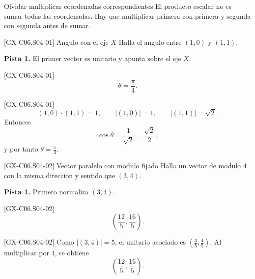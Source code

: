 \begin{commonerror}{Olvidar multiplicar coordenadas correspondientes}
El producto escalar no es sumar todas las coordenadas. Hay que multiplicar primera con primera
y segunda con segunda antes de sumar.
\end{commonerror}

\begin{guidedexercise}{[GX-C06.S04-01] Angulo con el eje \(X\)}
Halla el angulo entre \((1,0)\) y \((1,1)\).

\textbf{Pista 1.} El primer vector es unitario y apunta sobre el eje \(X\).
\end{guidedexercise}

\begin{shortanswer}{[GX-C06.S04-01]}
\[
\theta=\frac{\pi}{4}.
\]
\end{shortanswer}

\begin{fullsolution}{[GX-C06.S04-01]}
\[
(1,0)\cdot (1,1)=1,
\qquad
|(1,0)|=1,
\qquad
|(1,1)|=\sqrt{2}.
\]
Entonces
\[
\cos \theta=\frac{1}{\sqrt{2}}=\frac{\sqrt{2}}{2},
\]
y por tanto \(\theta=\frac{\pi}{4}\).
\end{fullsolution}

\begin{guidedexercise}{[GX-C06.S04-02] Vector paralelo con modulo fijado}
Halla un vector de modulo \(4\) con la misma direccion y sentido que \((3,4)\).

\textbf{Pista 1.} Primero normaliza \((3,4)\).
\end{guidedexercise}

\begin{shortanswer}{[GX-C06.S04-02]}
\[
\left(\frac{12}{5},\frac{16}{5}\right).
\]
\end{shortanswer}

\begin{fullsolution}{[GX-C06.S04-02]}
Como \(|(3,4)|=5\), el unitario asociado es \(\left(\frac{3}{5},\frac{4}{5}\right)\). Al
multiplicar por \(4\), se obtiene
\[
\left(\frac{12}{5},\frac{16}{5}\right).
\]
\end{fullsolution}


